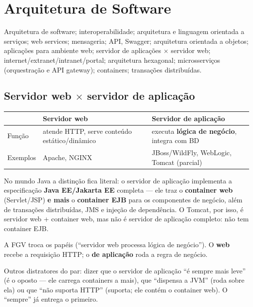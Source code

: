 \chapter{Arquitetura de Software}
\label{cap:arquitetura}

\begin{edital}
Arquitetura de software; interoperabilidade; arquitetura e linguagem
orientada a serviços; web services; mensageria; API, Swagger; arquitetura
orientada a objetos; aplicações para ambiente web; servidor de aplicações
$\times$ servidor web; internet/extranet/intranet/portal; arquitetura
hexagonal; microsserviços (orquestração e API gateway); containers;
transações distribuídas.
\end{edital}

\section{Servidor web $\times$ servidor de aplicação}

\begin{center}
\begin{tabular}{@{}p{2.4cm}p{4.6cm}p{4.6cm}@{}}
\toprule
& \textbf{Servidor web} & \textbf{Servidor de aplicação} \\
\midrule
Função & atende HTTP, serve conteúdo estático/dinâmico & executa \textbf{lógica de negócio}, integra com BD \\
Exemplos & Apache, NGINX & JBoss/WildFly, WebLogic, Tomcat (parcial) \\
\bottomrule
\end{tabular}
\end{center}

No mundo Java a distinção fica literal: o servidor de aplicação implementa a
especificação \textbf{Java EE/Jakarta EE} completa --- ele traz o
\textbf{container web} (Servlet/JSP) \textbf{e mais} o \textbf{container EJB}
para os componentes de negócio, além de transações distribuídas, JMS e
injeção de dependência. O Tomcat, por isso, é servidor web + container web,
mas não é servidor de aplicação completo: não tem container EJB.

\begin{pegadinha}
A FGV troca os papéis (``servidor web processa lógica de negócio''). O
\textbf{web} recebe a requisição HTTP; o \textbf{de aplicação} roda a regra
de negócio.

Outros distratores do par: dizer que o servidor de aplicação ``é sempre mais
leve'' (é o oposto --- ele carrega containers a mais), que ``dispensa a JVM''
(roda sobre ela) ou que ``não suporta HTTP'' (suporta; ele contém o container
web). O ``sempre'' já entrega o primeiro.
\end{pegadinha}

